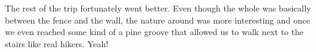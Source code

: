 \begin{post}
\begin{content}

The rest of the trip fortunately went better. Even though the whole was basically between the fence and the wall, the nature around was more interesting and once we even reached some kind of a pine groove that allowed us to walk next to the stairs like real hikers. Yeah!

\begin{figure}[h]
\centering
{}
\end{figure}



\end{content}
\end{post}
